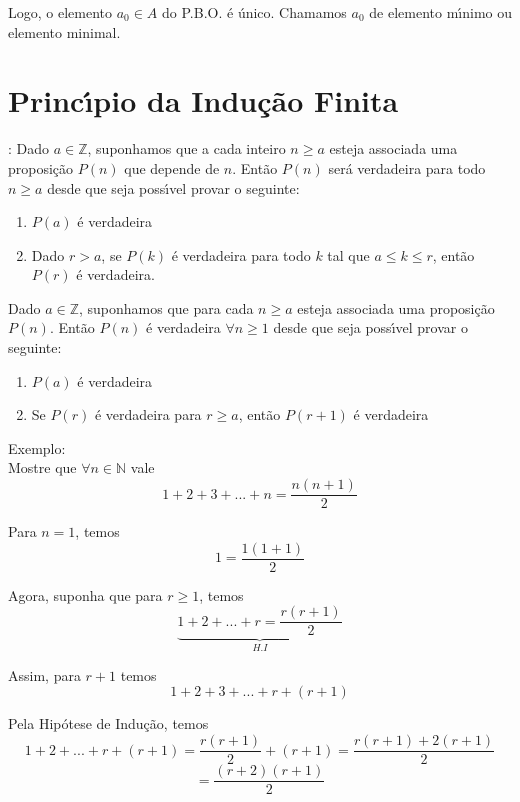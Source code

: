 Logo, o elemento $a_{0}\in A$ do P.B.O. {\'e} {\'u}nico. Chamamos $a_{0}$ de elemento m{\'\i}nimo ou elemento minimal.\\

\section{Princ{\'\i}pio da Indu{\c c}{\~a}o Finita}

\begin{teorema} : Dado $a\in\mathbb{Z}$, suponhamos que a cada inteiro $n\geq a$ esteja associada uma proposi{\c c}{\~a}o $P(n)$ que depende de $n$. Ent{\~a}o $P(n)$ ser{\'a} verdadeira para todo $n\geq a$ desde que seja poss{\'\i}vel provar o seguinte:
\begin{enumerate}
\item $P(a)$ {\'e} verdadeira
\item Dado $r>a$, se $P(k)$ {\'e} verdadeira para todo $k$ tal que $a\leq k\leq r$, ent{\~a}o $P(r)$ {\'e} verdadeira.
\end{enumerate}
\end{teorema}

\begin{teorema} Dado $a\in\mathbb{Z}$, suponhamos que para cada $n\geq a$ esteja associada uma proposi{\c c}{\~a}o $P(n)$. Ent{\~a}o $P(n)$ {\'e} verdadeira $\forall n\geq 1$ desde que seja poss{\'\i}vel provar o seguinte:
\begin{enumerate}
\item $P(a)$ {\'e} verdadeira
\item Se $P(r)$ {\'e} verdadeira para $r\geq a$, ent{\~a}o $P(r+1)$ {\'e} verdadeira
\end{enumerate}
\end{teorema}

Exemplo:\\

Mostre que $\forall n\in\mathbb{N}$ vale \[1+2+3+...+n=\displaystyle\frac{n(n+1)}{2}\]

Para $n=1$, temos
\[1=\displaystyle\frac{1(1+1)}{2}\]

Agora, suponha que para $r\geq 1$, temos \[\underbrace{1+2+...+r=\displaystyle\frac{r(r+1)}{2}}_{H.I}\]

Assim, para $r+1$ temos \[1+2+3+...+r+(r+1)\]

Pela Hip{\'o}tese de Indu{\c c}{\~a}o, temos \[1+2+...+r+(r+1)=\displaystyle\frac{r(r+1)}{2}+(r+1)=\displaystyle\frac{r(r+1)+2(r+1)}{2}\] \[=\displaystyle\frac{(r+2)(r+1)}{2}\]

